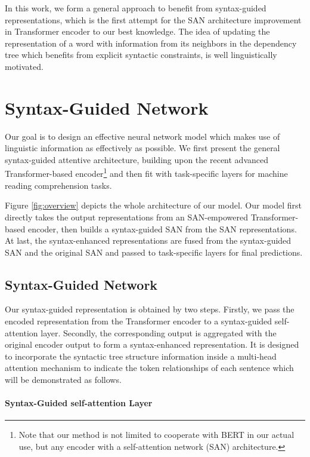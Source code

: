 \documentclass[letterpaper]{article} \usepackage{color}
\begin{document}
In this work, we form a general approach to benefit from syntax-guided representations, which is the first attempt for the SAN architecture improvement in Transformer encoder to our best knowledge. The idea of updating the representation of a word with information from its neighbors in the dependency tree which benefits from explicit syntactic constraints, is well linguistically motivated.

\section{Syntax-Guided Network}
Our goal is to design an effective neural network model which makes use of linguistic information as effectively as possible. We first present the general syntax-guided attentive architecture, building upon the recent advanced Transformer-based encoder\footnote{Note that our method is not limited to cooperate with BERT in our actual use, but any encoder with a self-attention network (SAN) architecture.} and then fit with task-specific layers for machine reading comprehension tasks.

Figure \ref{fig:overview} depicts the whole architecture of our model. Our model first directly takes the output representations from an SAN-empowered Transformer-based encoder, then builds a syntax-guided SAN from the SAN representations. At last, the syntax-enhanced representations are fused from the syntax-guided SAN and the original SAN and passed to task-specific layers for final predictions. 

\subsection{Syntax-Guided Network} \label{SG_ATT}

Our syntax-guided representation is obtained by two steps. Firstly, we pass the encoded representation from the Transformer encoder to a syntax-guided self-attention layer. Secondly, the corresponding output is aggregated with the original encoder output to form a syntax-enhanced representation. It is designed to incorporate the syntactic tree structure information inside a multi-head attention mechanism to indicate the token relationships of each sentence which will be demonstrated as follows.

\paragraph{Syntax-Guided self-attention Layer} 
\end{document}
